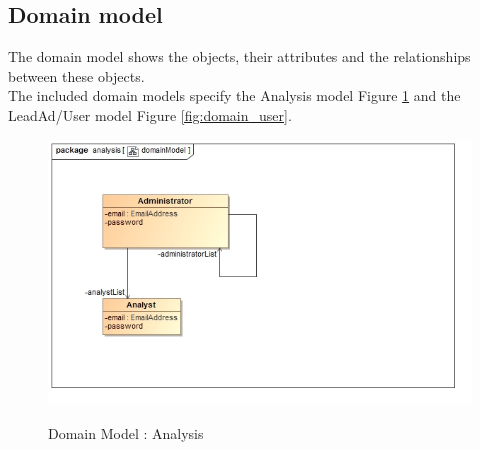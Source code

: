 \documentclass{article}
\begin{document}



\pagebreak
\subsection{Domain model}\label{sec:domain}
The domain model shows the objects, their attributes and the relationships between these objects. \\
The included domain models specify the Analysis model Figure \ref{fig:domain_admin} and the LeadAd/User model Figure \ref{fig:domain_user}.
\begin{figure}[H]
\includegraphics[width=\textwidth]{images/class__analysis__domainModel.jpg}  \\
\caption{Domain Model : Analysis}
\label{fig:domain_admin}
\end{figure}
\end{document}

